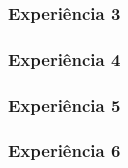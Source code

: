 \documentclass[a4paper]{article}
\begin{document}
	\subsubsection{Experiência 3}
	\subsubsection{Experiência 4}
	\subsubsection{Experiência 5}
	\subsubsection{Experiência 6}


	
\end{document}

